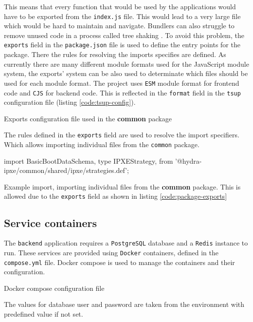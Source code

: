 \documentclass[../main.tex]{subfiles}
\begin{document}
This means that every function that would be used by the applications would have to be exported from the \texttt{index.js} file.
This would lead to a very large file which would be hard to maintain and navigate. Bundlers can also struggle to remove unused code in a process called tree shaking \cite{tree-shaking}.
To avoid this problem, the \texttt{exports} field in the \texttt{package.json} file is used to define the entry points for the package.
There the rules for resolving the imports specifies are defined. As currently there are many different module formats used for the JavaScript module system,
the exports' system can be also used to determinate which files should be used for each module format. The project uses \texttt{ESM} \cite{esm} module format for frontend code and \texttt{CJS} \cite{cjs} for backend code.
This is reflected in the \texttt{format} field in the \texttt{tsup} configuration file (listing \ref{code:tsup-config}).

\begin{listing}[H]
  \caption{Exports configuration file used in the \textbf{common} package}
  \label{code:package-exports}
\end{listing}

The rules defined in the \texttt{exports} field are used to resolve the import specifiers. Which allows importing individual files from the \texttt{common} package.

\begin{listing}[H]
  \begin{tscode}
    import {
    BasicBootDataSchema,
    type IPXEStrategy,
    } from '@hydra-ipxe/common/shared/ipxe/strategies.def';
  \end{tscode}
  \caption{Example import, importing individual files from the \textbf{common} package. This is allowed due to the \texttt{exports} field as shown in listing \ref{code:package-exports}}
\end{listing}

\subsection{Service containers}

The \texttt{backend} application requires a \texttt{PostgreSQL} database and a \texttt{Redis} instance to run.
These services are provided using \texttt{Docker} containers, defined in the \texttt{compose.yml} file.
Docker compose \cite{docker-compose} is used to manage the containers and their configuration.

\begin{listing}[H]
  \caption{Docker compose configuration file}
\end{listing}

The values for database user and password are taken from the environment with predefined value if not set.
\end{document}
